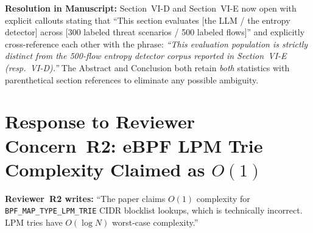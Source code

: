 \documentclass[10pt,letterpaper]{article}
\begin{document}
\begin{authorbox}
\textbf{Resolution in Manuscript:} Section~VI-D and Section~VI-E now open with
explicit callouts stating that ``This section evaluates [the LLM / the entropy
detector] across [300 labeled threat scenarios / 500 labeled flows]'' and
explicitly cross-reference each other with the phrase:
\emph{``This evaluation population is strictly distinct from the 500-flow
entropy detector corpus reported in Section~VI-E (resp.\ VI-D).''} The
Abstract and Conclusion both retain \emph{both} statistics with parenthetical
section references to eliminate any possible ambiguity.
\end{authorbox}

\section{Response to Reviewer Concern~R2: eBPF LPM Trie Complexity Claimed
as $O(1)$}

\begin{reviewerbox}
\textbf{Reviewer~R2 writes:} ``The paper claims $O(1)$ complexity for
\texttt{BPF\_MAP\_TYPE\_LPM\_TRIE} CIDR blocklist lookups, which is
technically incorrect. LPM tries have $O(\log N)$ worst-case complexity.''
\end{reviewerbox}
\end{document}
